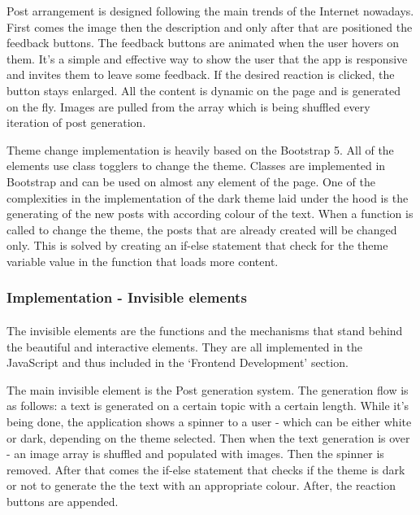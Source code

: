 \documentclass[12pt]{report}
\begin{document}
Post arrangement is designed following the main trends of the Internet nowadays. First comes the image then the description and
only after that are positioned the feedback buttons. The feedback buttons are animated when the user hovers on them. It's a simple
and effective way to show the user that the app is responsive and invites them to leave some feedback. If the desired reaction is clicked,
the button stays enlarged. All the content is dynamic on the page and is generated on the fly. Images are pulled from the array which is being
shuffled every iteration of post generation. 

Theme change implementation is heavily based on the Bootstrap 5. All of the elements use class togglers to change the theme.
Classes are implemented in Bootstrap and can be used on almost any element of the page. One of the complexities in the implementation
of the dark theme laid under the hood is the generating of the new posts with according colour of the text. When a function
is called to change the theme, the posts that are already created will be changed only. This is solved by creating an if-else
statement that check for the theme variable value in the function that loads more content.

\clearpage

\subsubsection*{Implementation - Invisible elements}
\paragraph{}
The invisible elements are the functions and the mechanisms that stand behind the beautiful and interactive elements.
They are all implemented in the JavaScript and thus included in the `Frontend Development' section.

The main invisible element is the Post generation system. The generation flow is as follows: a text is generated on a certain topic
with a certain length. While it's being done, the application shows a spinner to a user - which can be either white or dark, depending
on the theme selected. Then when the text generation is over - an image array is shuffled and populated with images. Then the spinner is removed.
After that comes the if-else statement that checks if the theme is dark or not to generate the the text with an 
appropriate colour. After, the reaction buttons are appended.
\end{document}

